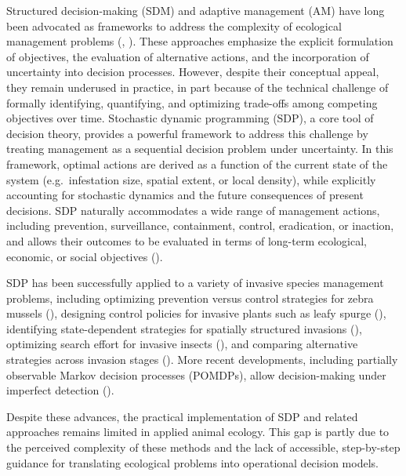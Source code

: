 \documentclass[
  11pt,
  a4paper,
]{article}
\begin{document}
Structured decision-making (SDM) and adaptive management (AM) have long been advocated as frameworks to address the complexity of ecological management problems (, ). These approaches emphasize the explicit formulation of objectives, the evaluation of alternative actions, and the incorporation of uncertainty into decision processes. However, despite their conceptual appeal, they remain underused in practice, in part because of the technical challenge of formally identifying, quantifying, and optimizing trade-offs among competing objectives over time. Stochastic dynamic programming (SDP), a core tool of decision theory, provides a powerful framework to address this challenge by treating management as a sequential decision problem under uncertainty. In this framework, optimal actions are derived as a function of the current state of the system (e.g.~infestation size, spatial extent, or local density), while explicitly accounting for stochastic dynamics and the future consequences of present decisions. SDP naturally accommodates a wide range of management actions, including prevention, surveillance, containment, control, eradication, or inaction, and allows their outcomes to be evaluated in terms of long-term ecological, economic, or social objectives ().

SDP has been successfully applied to a variety of invasive species management problems, including optimizing prevention versus control strategies for zebra mussels (), designing control policies for invasive plants such as leafy spurge (), identifying state-dependent strategies for spatially structured invasions (), optimizing search effort for invasive insects (), and comparing alternative strategies across invasion stages (). More recent developments, including partially observable Markov decision processes (POMDPs), allow decision-making under imperfect detection ().

Despite these advances, the practical implementation of SDP and related approaches remains limited in applied animal ecology. This gap is partly due to the perceived complexity of these methods and the lack of accessible, step-by-step guidance for translating ecological problems into operational decision models.
\end{document}
